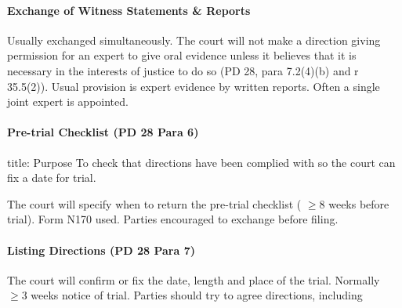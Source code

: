 \documentclass[
]{article}
\newenvironment{Shaded}{}{}
\newcommand{\NormalTok}[1]{#1}
\begin{document}
\hypertarget{exchange-of-witness-statements-reports}{%
\paragraph{Exchange of Witness Statements \&
Reports}\label{exchange-of-witness-statements-reports}}

Usually exchanged simultaneously. The court will not make a direction
giving permission for an expert to give oral evidence unless it believes
that it is necessary in the interests of justice to do so (PD 28, para
7.2(4)(b) and r 35.5(2)). Usual provision is expert evidence by written
reports. Often a single joint expert is appointed.

\hypertarget{pre-trial-checklist-pd-28-para-6}{%
\paragraph{Pre-trial Checklist (PD 28 Para
6)}\label{pre-trial-checklist-pd-28-para-6}}

\begin{Shaded}
\begin{Highlighting}[]
\NormalTok{title: Purpose}
\NormalTok{To check that directions have been complied with so the court can fix a date for trial.}
\end{Highlighting}
\end{Shaded}

The court will specify when to return the pre-trial checklist (
\(\geq 8\) weeks before trial). Form N170 used. Parties encouraged to
exchange before filing.

\hypertarget{listing-directions-pd-28-para-7}{%
\paragraph{Listing Directions (PD 28 Para
7)}\label{listing-directions-pd-28-para-7}}

The court will confirm or fix the date, length and place of the trial.
Normally \(\geq 3\) weeks notice of trial. Parties should try to agree
directions, including
\end{document}
